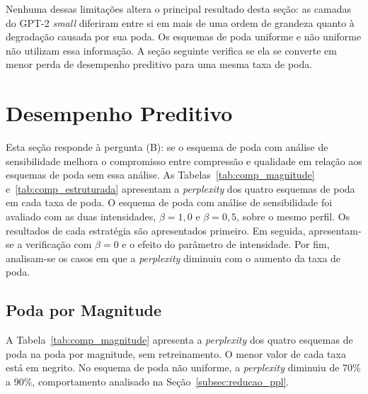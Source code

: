 Nenhuma dessas limitações altera o principal resultado desta seção: as camadas do GPT-2
\textit{small} diferiram entre si em mais de uma ordem de grandeza quanto à degradação causada
por sua poda. Os esquemas de poda uniforme e não uniforme não utilizam essa informação. A seção
seguinte verifica se ela se converte em menor perda de desempenho preditivo para uma mesma taxa
de poda.

\section{Desempenho Preditivo}\label{sec:res_qualidade}

Esta seção responde à pergunta (B): se o esquema de poda com análise de sensibilidade melhora o
compromisso entre compressão e qualidade em relação aos esquemas de poda sem essa análise. As
Tabelas~\ref{tab:comp_magnitude} e~\ref{tab:comp_estruturada} apresentam a \textit{perplexity}
dos quatro esquemas de poda em cada taxa de poda. O esquema de poda com análise de
sensibilidade foi avaliado com as duas intensidades, $\beta = 1{,}0$ e $\beta = 0{,}5$, sobre o
mesmo perfil. Os resultados de cada estratégia são apresentados primeiro. Em seguida,
apresentam-se a verificação com $\beta = 0$ e o efeito do parâmetro de intensidade. Por fim,
analisam-se os casos em que a \textit{perplexity} diminuiu com o aumento da taxa de poda.

\subsection{Poda por Magnitude}\label{subsec:aloc_magnitude}\label{sec:res_magnitude}

A Tabela~\ref{tab:comp_magnitude} apresenta a \textit{perplexity} dos quatro esquemas de poda
na poda por magnitude, sem retreinamento. O menor valor de cada taxa está em negrito. No
esquema de poda não uniforme, a \textit{perplexity} diminuiu de 70\% a 90\%, comportamento
analisado na Seção~\ref{subsec:reducao_ppl}.

\begin{table}[htb]
\centering
\caption{\textit{Perplexity} da poda por magnitude, sem retreinamento, nos quatro esquemas de
poda.}
\label{tab:comp_magnitude}
\small

\end{table}

